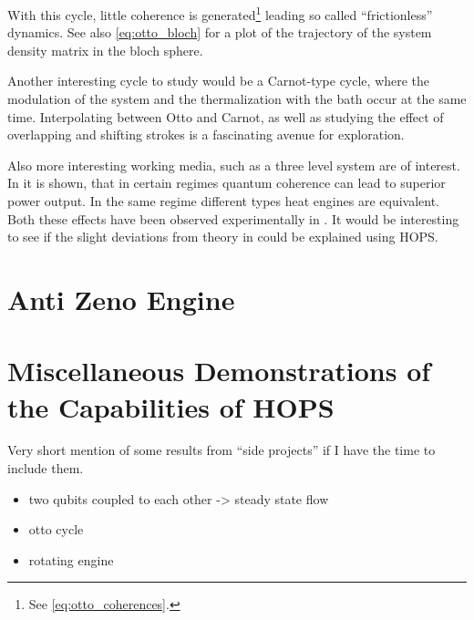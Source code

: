 With this cycle, little coherence is generated\footnote{See
  \cref{eq:otto_coherences}.} leading so called ``frictionless''
dynamics. See also \cref{eq:otto_bloch} for a plot of the trajectory
of the system density matrix in the bloch sphere.


Another interesting cycle to study would be a Carnot-type cycle, where
the modulation of the system and the thermalization with the bath
occur at the same time. Interpolating between Otto and Carnot, as well
as studying the effect of overlapping and shifting strokes is a
fascinating avenue for exploration.

Also more interesting working media, such as a three level system are
of interest. In \cite{Uzdin2015Sep} it is shown, that in certain
regimes quantum coherence can lead to superior power output. In the
same regime different types heat engines are equivalent. Both these
effects have been observed experimentally in \cite{Klatzow2019Mar}. It
would be interesting to see if the slight deviations from theory in
\cite{Klatzow2019Mar} could be explained using HOPS.


\newpage
\section{Anti Zeno Engine}
\label{sec:antizeno}


\section{Miscellaneous Demonstrations of the Capabilities of HOPS}
\label{sec:miscdemo}
Very short mention of some results from ``side projects'' if I have
the time to include them.

\begin{itemize}
\item two qubits coupled to each other -> steady state flow
\item otto cycle
\item rotating engine
\end{itemize}

